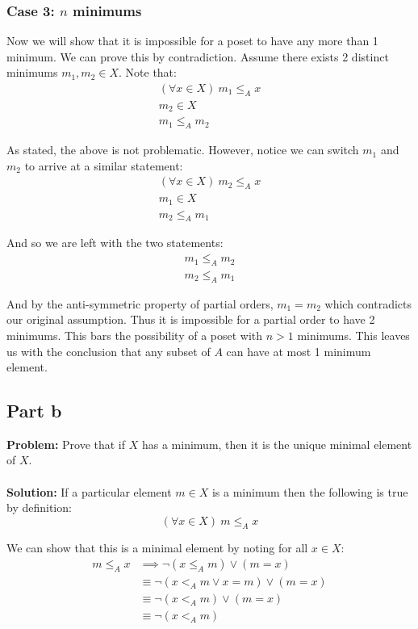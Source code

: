 \documentclass{article}
\begin{document}
\subsubsection*{Case 3: $n$ minimums}
Now we will show that it is impossible for a poset to have any more than 1 minimum. We can prove this by contradiction. Assume there exists 2 distinct minimums $m_1,m_2\in X$. Note that:
\begin{align*}
  (\forall x\in X)\ m_1\le_A x\tag{def. of minimum}\\
  m_2\in X\tag{given}\\
  m_1\le_A m_2
\end{align*}

As stated, the above is not problematic. However, notice we can switch $m_1$ and $m_2$ to arrive at a similar statement:
\begin{align*}
  (\forall x\in X)\ m_2\le_A x\tag{def. of minimum}\\
  m_1\in X\tag{given}\\
  m_2\le_A m_1
\end{align*}

And so we are left with the two statements:
\begin{align*}
  m_1\le_A m_2\\
  m_2\le_A m_1
\end{align*}

And by the anti-symmetric property of partial orders, $m_1=m_2$ which contradicts our original assumption. Thus it is impossible for a partial order to have 2 minimums. This bars the possibility of a poset with $n>1$ minimums. This leaves us with the conclusion that any subset of $A$ can have at most 1 minimum element.

\subsection*{Part b}
\textbf{Problem:} Prove that if $X$ has a minimum, then it is the unique minimal element of $X$.
\\\\
\textbf{Solution:} If a particular element $m\in X$ is a minimum then the following is true by definition:
$$(\forall x\in X)\ m\le_A x$$

We can show that this is a minimal element by noting for all $x\in X$:
\begin{align*}
  m\le_A x&\implies \neg(x\le_A m)\vee (m=x)\tag{anti-symmetry}\\
  &\equiv \neg(x<_Am\vee x=m)\vee (m=x)\tag{def. of partial order}\\
  &\equiv \neg(x<_Am)\vee (m=x)\\
  &\equiv \neg(x<_Am)\tag{def. of a minimal element}\\
\end{align*}
\end{document}
